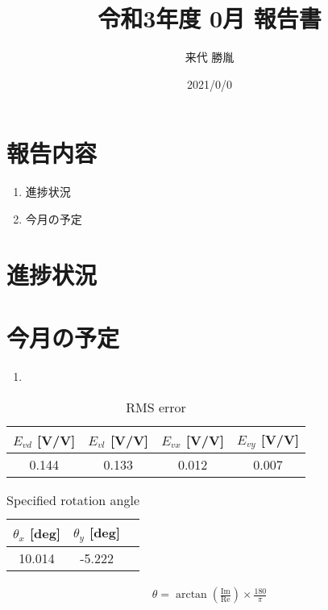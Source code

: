 \documentclass[twocolumn,a4j]{jsarticle}
\author{来代 勝胤}
\title{令和3年度 0月 報告書}
\date{2021/0/0}
\begin{document}
\columnseprule=0.1mm
\maketitle
\section*{報告内容}
\begin{enumerate}[1.]
    \item 進捗状況
    \item 今月の予定
\end{enumerate}
\section{進捗状況}
\section{今月の予定}
\begin{enumerate}[1.]
    \item 
\end{enumerate}

\begin{table}[htbp]
    \begin{center}
      \caption{RMS error}
      \begin{tabular}{|p{20mm}|p{20mm}p{20mm}|p{20mm}|}
        \hline
        \multicolumn{1}{|c|}{$E_{vd}$ [V/V]} & \multicolumn{1}{|c|}{$E_{vl}$ [V/V]} & \multicolumn{1}{|c|}{$E_{vx}$ [V/V]} & \multicolumn{1}{|c|}{$E_{vy}$ [V/V]} \\ \hline
        \multicolumn{1}{|c|}{0.144}          & \multicolumn{1}{|c|}{0.133}          & \multicolumn{1}{|c|}{0.012}          & \multicolumn{1}{|c|}{0.007}          \\ \hline
      \end{tabular}
    \end{center}
\end{table}
    
    \begin{table}[htbp]
        \begin{center}
          \caption{Specified rotation angle}
          \begin{tabular}{|p{30mm}|p{20mm}|p{20mm}|}
            \hline
            \multicolumn{1}{|c|}{$\theta_x$ [deg]} & \multicolumn{1}{|c|}{$\theta_y$ [deg]} \\ \hline
            \multicolumn{1}{|c|}{10.014}            & \multicolumn{1}{|c|}{-5.222}            \\ \hline
          \end{tabular}
        \end{center}
      \end{table}

\begin{eqnarray*}
    \theta = \arctan \left(\frac{\mathrm{Im}}{\mathrm{Re}}\right) \times \frac{180}{\pi}
\end{eqnarray*}
\end{document}
